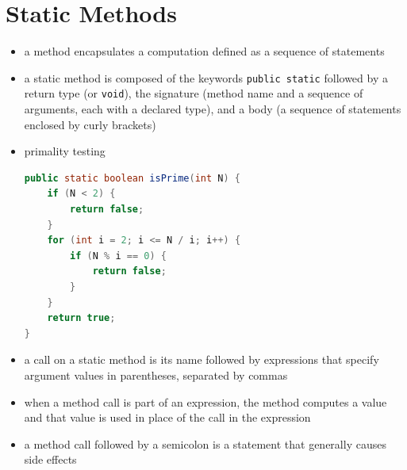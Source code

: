 \documentclass[8pt,a4paper,compress]{beamer}
\begin{document}
\section{Static Methods}
\begin{frame}[fragile]
\begin{itemize}
\item a method encapsulates a computation defined as a sequence of statements

\item a static method is composed of the keywords \lstinline{public static} followed by a return type (or \lstinline{void}), the signature (method name and a sequence of arguments, each with a declared type), and a body (a sequence of statements enclosed by curly brackets)

\item primality testing
\begin{lstlisting}[language=Java]
public static boolean isPrime(int N) {
    if (N < 2) {
        return false;
    }
    for (int i = 2; i <= N / i; i++) {
        if (N % i == 0) {
            return false;
        }
    }
    return true;
}
\end{lstlisting}

\item a call on a static method is its name followed by expressions that specify argument values in parentheses, separated by commas

\item when a method call is part of an expression, the method computes a value and that value is used in place of the call in the expression

\item a method call followed by a semicolon is a statement that generally causes side effects
\end{itemize}
\end{frame}
\end{document}
